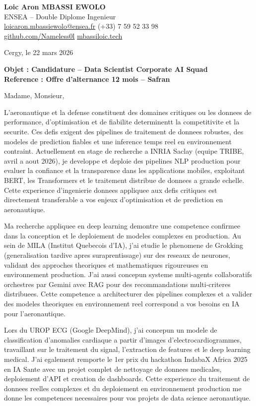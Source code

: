 \documentclass[a4paper,11pt]{article}
\begin{document}
\noindent
\textbf{Loic Aron MBASSI EWOLO} \\
ENSEA -- Double Diplome Ingenieur \\
\href{mailto:loicaron.mbassiewolo@ensea.fr}{loicaron.mbassiewolo@ensea.fr} \quad (+33) 7 59 52 33 98 \\
\href{https://github.com/Nameless0l}{github.com/Nameless0l} \quad \href{https://mbassiloic.tech}{mbassiloic.tech}

\vspace{1em}
\noindent
Cergy, le 22 mars 2026

\vspace{1em}
\noindent
\textbf{Objet : Candidature -- Data Scientist Corporate AI Squad} \\
\textbf{Reference : Offre d'alternance 12 mois -- Safran}

\vspace{1.5em}
\noindent Madame, Monsieur,

L'aeronautique et la defense constituent des domaines critiques ou les donnees de performance, d'optimisation et de fiabilite determinentt la competitivite et la securite. Ces defis exigent des pipelines de traitement de donnees robustes, des modeles de prediction fiables et une inference temps reel en environnement contraint. Actuellement en stage de recherche a INRIA Saclay (equipe TRIBE, avril a aout 2026), je developpe et deploie des pipelines NLP production pour evaluer la confiance et la transparence dans les applications mobiles, exploitant BERT, les Transformers et le traitement distribue de donnees a grande echelle. Cette experience d'ingenierie donnees appliquee aux defis critiques est directement transferable a vos enjeux d'optimisation et de prediction en aeronautique.

Ma recherche appliquee en deep learning demontre une competence confirmee dans la conception et le deploiement de modeles complexes en production. Au sein de MILA (Institut Quebecois d'IA), j'ai etudie le phenomene de Grokking (generalisation tardive apres suraprentissage) sur des reseaux de neurones, validant des approches theoriques et mathematiques rigoureuses en environnement production. J'ai aussi concepun systeme multi-agents collaboratifs orchestres par Gemini avec RAG pour des recommandations multi-criteres distribuees. Cette competence a architecturer des pipelines complexes et a valider des modeles theoriques en environnement reel correspond a vos besoins en IA pour l'aeronautique.

Lors du UROP ECG (Google DeepMind), j'ai concepun un modele de classification d'anomalies cardiaque a partir d'images d'electrocardiogrammes, travaillant sur le traitement du signal, l'extraction de features et le deep learning medical. J'ai egalement remporte le 1er prix du hackathon IndabaX Africa 2025 en IA Sante avec un projet complet de nettoyage de donnees medicales, deploiement d'API et creation de dashboards. Cette experience du traitement de donnees reelles complexes et du deploiement en environnement production me donne les competences necessaires pour vos projets de data science aeronautique.
\end{document}
